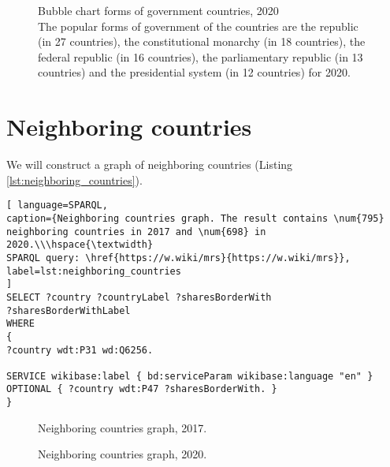 \begin{figure}
	{
		\setlength{\fboxsep}{0pt}%
		\setlength{\fboxrule}{1pt}%
	}
	\caption{Bubble chart forms of government countries, 2020
		\\ 
		The popular forms of government of the countries are the republic (in 27 countries), the constitutional monarchy (in 18 countries), the federal republic (in 16 countries), the parliamentary republic (in 13 countries) and the presidential system (in 12 countries) for 2020.
	}%
	\label{fig:bubble_chart_forms_of_government_countries_2020}%
\end{figure}

\section{Neighboring countries}

We will construct a graph of neighboring countries (Listing \ref{lst:neighboring_countries}).

\begin{lstlisting}[ language=SPARQL, 
caption={Neighboring countries graph. The result contains \num{795} neighboring countries in 2017 and \num{698} in 2020.\\\hspace{\textwidth}
SPARQL query: \href{https://w.wiki/mrs}{https://w.wiki/mrs}},
label=lst:neighboring_countries
]
SELECT ?country ?countryLabel ?sharesBorderWith 
?sharesBorderWithLabel
WHERE
{
?country wdt:P31 wd:Q6256.

SERVICE wikibase:label { bd:serviceParam wikibase:language "en" }
OPTIONAL { ?country wdt:P47 ?sharesBorderWith. }
}
\end{lstlisting}


\begin{figure*}
	{
		\setlength{\fboxsep}{0pt}%
		\setlength{\fboxrule}{1pt}%
	}
	\caption{Neighboring countries graph, 2017.
	}%
	\label{fig:neighboring_countries_2017}%
\end{figure*}

\begin{figure*}
	{
		\setlength{\fboxsep}{0pt}%
		\setlength{\fboxrule}{1pt}%
	}
	\caption{Neighboring countries graph, 2020.
	}%
	\label{fig:neighboring_countries_2020}%
\end{figure*}

